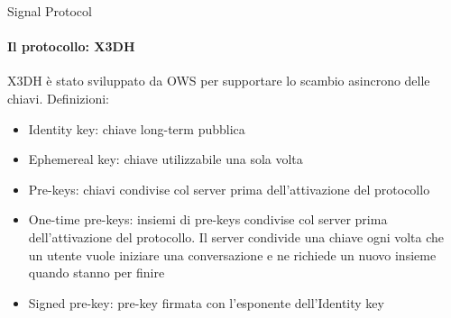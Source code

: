 \begin{frame}{Signal Protocol}
    \framesubtitle{Il protocollo: X3DH}
    X3DH è stato sviluppato da OWS per supportare lo scambio asincrono delle chiavi. \cite{X3DH}\pause\newline
    Definizioni:
    \begin{itemize}
        \item Identity key: chiave long-term pubblica\pause
        \item Ephemereal key: chiave utilizzabile una sola volta \pause
        \item Pre-keys: chiavi condivise col server prima dell'attivazione del protocollo\pause
        \item One-time pre-keys: insiemi di pre-keys condivise col server prima dell'attivazione del protocollo. Il server condivide una chiave ogni volta che un utente vuole iniziare una conversazione e ne richiede un nuovo insieme quando stanno per finire\pause
        \item Signed pre-key: pre-key firmata con l'esponente dell'Identity key
    \end{itemize}

\end{frame}

